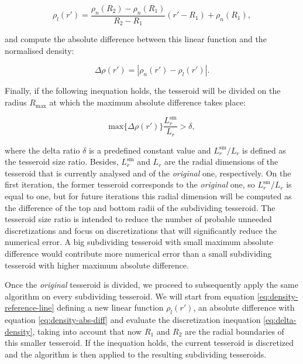 \documentclass[extra]{gji}
\begin{document}
\begin{equation}
    \rho_l(r') =
    \frac{ \rho_n(R_2) - \rho_n(R_1) }{ R_2 - R_1 } (r' - R_1) + \rho_n(R_1),
    \label{eq:density-reference-line}
\end{equation}

\noindent and compute the absolute difference between this linear 
function and the normalised density:

\begin{equation}
    \Delta \rho (r') = | \rho_n(r') - \rho_l(r') |.
    \label{eq:density-abs-diff}
\end{equation}

Finally, if the following inequation holds, the tesseroid will be divided on 
the radius $R_\text{max}$ at which the maximum absolute difference takes 
place:

\begin{equation}
    \text{max}\{ \Delta \rho(r') \} \frac{L_r^\text{sm}}{L_r} > \delta,
    \label{eq:delta-density}
\end{equation}

\noindent where the delta ratio $\delta$ is a predefined constant value 
and $L_r^\text{sm}/L_r$ is defined as the tesseroid size ratio.
Besides, $L_r^\text{sm}$ and $L_r$ are the radial dimensions of the 
tesseroid that is currently analysed and of the \emph{original} one, 
respectively.
On the first iteration, the former tesseroid corresponds to the 
\emph{original} one, so $L_r^\text{sm}/L_r$ is equal to one, but for 
future iterations this radial dimension will be computed as the 
difference of the top and bottom radii of the subdividing tesseroid.
The tesseroid size ratio is intended to reduce the number of probable 
unneeded discretizations and focus on discretizations that will 
significantly reduce the numerical error.
A big subdividing tesseroid with small maximum absolute difference would 
contribute more numerical error than a small subdividing tesseroid with 
higher maximum absolute difference.

Once the \emph{original} tesseroid is divided, we proceed to 
subsequently apply the same algorithm on every subdividing tesseroid.
We will start from equation \ref{eq:density-reference-line} defining a 
new linear function $\rho_l(r')$, an absolute difference with equation 
\ref{eq:density-abs-diff} and evaluate the discretization inequation 
\ref{eq:delta-density}, taking into account that now $R_1$ and $R_2$ 
are the radial boundaries of this smaller tesseroid.
If the inequation holds, the current tesseroid is discretized and the 
algorithm is then applied to the resulting subdividing tesseroids.
\end{document}

